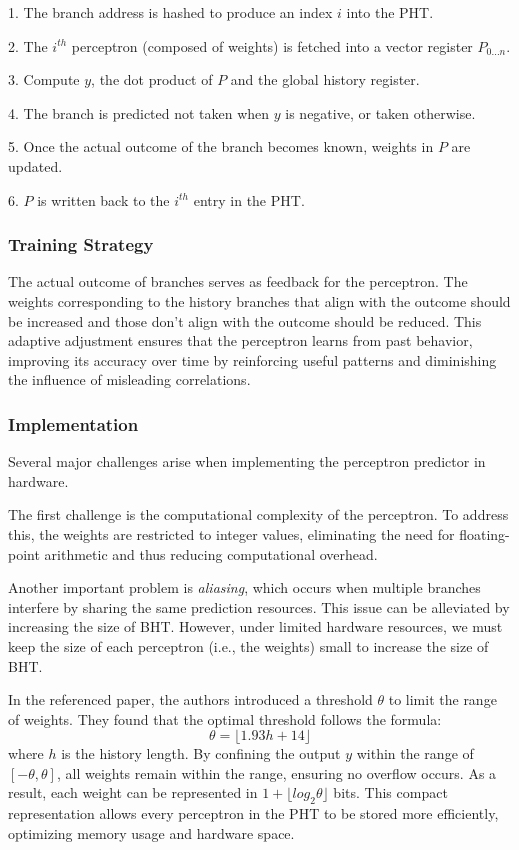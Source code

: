 \documentclass{article}
\begin{document}
1.  The branch address is hashed to produce an index $i$ into the PHT.

2.  The $i^{th}$ perceptron (composed of weights) is fetched into a vector register $P_{0...n}$. 

3.  Compute $y$, the dot product of $P$ and the global history register.

4.  The branch is predicted not taken when $y$ is negative, or taken otherwise.

5.  Once the actual outcome of the branch becomes known, weights in $P$ are updated.


6.  $P$ is written back to the $i^{th}$ entry in the PHT.

\subsubsection{Training Strategy}
The actual outcome of branches serves as feedback for the perceptron. The weights corresponding to the history branches that align with the outcome should be increased and those don't align with the outcome should be reduced. This adaptive adjustment ensures that the perceptron learns from past behavior, improving its accuracy over time by reinforcing useful patterns and diminishing the influence of misleading correlations.

\subsubsection{Implementation}
Several major challenges arise when implementing the perceptron predictor in hardware.

The first challenge is the computational complexity of the perceptron. To address this, the weights are restricted to integer values, eliminating the need for floating-point arithmetic and thus reducing computational overhead.

Another important problem is \textit{aliasing}, which occurs when multiple branches interfere by sharing the same prediction resources. This issue can be alleviated by increasing the size of BHT. However, under limited hardware resources, we must keep the size of each perceptron (i.e., the weights) small to increase the size of BHT.

In the referenced paper, the authors introduced a threshold $\theta$ to limit the range of weights. They found that the optimal threshold follows the formula:
$$\theta = \lfloor 1.93h + 14\rfloor$$
where $h$ is the history length. By confining the output $y$ within the range of $[-\theta, \theta]$, all weights remain within the range, ensuring no overflow occurs. As a result, each weight can be represented in $1+\lfloor log_2 \theta \rfloor$ bits. This compact representation allows every perceptron in the PHT to be stored more efficiently, optimizing memory usage and hardware space.
\end{document}
